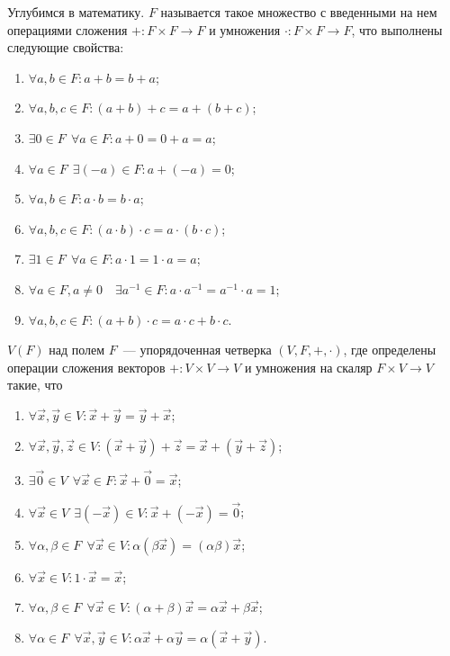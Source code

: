     Углубимся в математику.  $F$ называется такое множество с введенными на нем операциями сложения $+:F \times F  \rightarrow F$ и умножения $\cdot: F \times F \rightarrow F$, что выполнены следующие свойства:
    \begin{enumerate}
        \item  $\forall a, b \in F: a+ b = b + a$;
        \item $\forall a, b, c \in F : (a + b) + c = a + ( b + c)$;
        \item  $\exists 0 \in F~~\forall a \in F: a  + 0 = 0 + a = a$;
        \item  $\forall a \in F ~~ \exists (-a) \in F: a + (-a) = 0$;
        \item  $\forall a, b \in F: a \cdot b = b \cdot a$;
        \item  $\forall a, b, c \in F : (a \cdot b) \cdot c = a \cdot ( b \cdot c)$;
        \item $\exists 1 \in F~~\forall a \in F: a \cdot 1 = 1 \cdot a = a$;
        \item  $\forall a \in F, a \not = 0 \quad \exists a^{-1} \in F: a \cdot a^{-1} = a^{-1} \cdot a = 1$;
        \item $\forall a, b, c \in F: (a + b) \cdot c = a \cdot c + b \cdot c$.
    \end{enumerate}

     $V(F)$ над полем $F$~--- упорядоченная четверка $(V, F, + , \cdot)$, где определены операции сложения векторов $+ : V \times V \rightarrow V$ и умножения на скаляр $F \times V \rightarrow V$ такие, что
    \begin{enumerate}
        \item $\forall \vec{x}, \vec{y} \in V: \vec{x} + \vec{y} = \vec{y} + \vec{x}$;
        \item $ \forall \vec{x}, \vec{y}, \vec{z} \in V: (\vec{x} + \vec{y}) + \vec{z} =  \vec{x} + (\vec{y} + \vec{z})$;
        \item $\exists \vec{0} \in V~~\forall \vec{x} \in F: \vec{x} + \vec{0} = \vec{x}$;
        \item $\forall \vec{x} \in V~~\exists (-\vec{x}) \in V: \vec{x} + (-\vec{x}) = \vec{0}$;
        \item $\forall \alpha, \beta \in F~~\forall \vec{x} \in V: \alpha(\beta \vec{x}) =  (\alpha \beta) \vec{x}$;
        \item $\forall \vec{x} \in V: 1 \cdot \vec{x} = \vec{x}$;
        \item $\forall \alpha, \beta \in F~~\forall \vec{x} \in V: (\alpha + \beta) \vec{x} = \alpha \vec{x} + \beta \vec{x}$;
        \item $\forall \alpha \in F~~\forall \vec{x}, \vec{y} \in V: \alpha \vec{x} + \alpha \vec{y} = \alpha ( \vec{x} + \vec{y})$.
    \end{enumerate}

